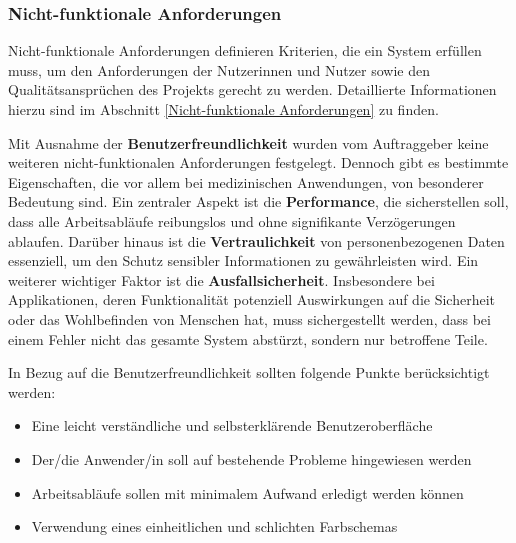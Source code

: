 
    \subsubsection{Nicht-funktionale Anforderungen}

    Nicht-funktionale Anforderungen definieren Kriterien, die ein System erfüllen muss, um den Anforderungen der Nutzerinnen und Nutzer sowie den Qualitätsansprüchen des Projekts gerecht zu werden. 
    Detaillierte Informationen hierzu sind im Abschnitt \ref{Nicht-funktionale Anforderungen} zu finden.

    Mit Ausnahme der \textbf{Benutzerfreundlichkeit} wurden vom Auftraggeber keine weiteren nicht-funktionalen Anforderungen festgelegt. Dennoch gibt es bestimmte Eigenschaften, die vor allem bei medizinischen Anwendungen, von besonderer Bedeutung sind.
    Ein zentraler Aspekt ist die \textbf{Performance}, die sicherstellen soll, dass alle Arbeitsabläufe reibungslos und ohne signifikante Verzögerungen ablaufen. Darüber hinaus ist die \textbf{Vertraulichkeit} von personenbezogenen Daten essenziell, um den Schutz sensibler Informationen zu gewährleisten wird. 
    Ein weiterer wichtiger Faktor ist die \textbf{Ausfallsicherheit}. Insbesondere bei Applikationen, deren Funktionalität potenziell Auswirkungen auf die Sicherheit oder das Wohlbefinden von Menschen hat, muss sichergestellt werden, dass bei einem Fehler nicht das gesamte System abstürzt, sondern nur betroffene Teile.

    In Bezug auf die Benutzerfreundlichkeit sollten folgende Punkte berücksichtigt werden:
    \begin{itemize}
        \item Eine leicht verständliche und selbsterklärende Benutzeroberfläche
        \item Der/die Anwender/in soll auf bestehende Probleme hingewiesen werden
        \item Arbeitsabläufe sollen mit minimalem Aufwand erledigt werden können
        \item Verwendung eines einheitlichen und schlichten Farbschemas
    \end{itemize}
    
